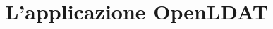 \setlength{\parskip}{1em}
\setlength{\parindent}{0pt}
\chapter{L'applicazione OpenLDAT}
\label{chap:app}






